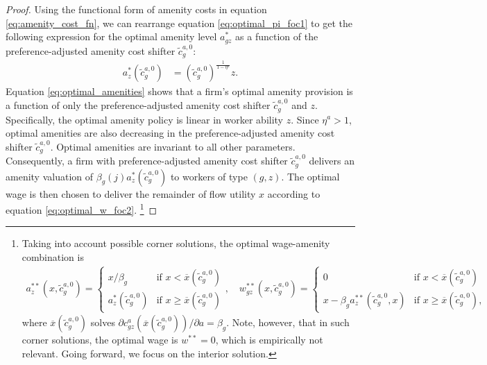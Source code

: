 \begin{proof}
    Using the functional form of amenity costs in equation \eqref{eq:amenity_cost_fn}, we can rearrange equation \eqref{eq:optimal_pi_foc1} to get the following expression for the optimal amenity level $a_{gz}^{*}$ as a function of the preference-adjusted amenity cost shifter $\tilde{c}_{g}^{a,0}$:
    \begin{align}
        a_{z}^{*}\left(\tilde{c}_{g}^{a,0}\right) &= \left(\tilde{c}_{g}^{a,0} \right)^{\frac{1}{1 - \eta^{a}}} z. \label{eq:optimal_amenities}
    \end{align}
    Equation \eqref{eq:optimal_amenities} shows that a firm's optimal amenity provision is a function of only the preference-adjusted amenity cost shifter $\tilde{c}_{g}^{a,0}$ and $z$. Specifically, the optimal amenity policy is linear in worker ability $z$. Since $\eta^{a} > 1$, optimal amenities are also decreasing in the preference-adjusted amenity cost shifter $\tilde{c}_{g}^{a,0}$. Optimal amenities are invariant to all other parameters. Consequently, a firm with preference-adjusted amenity cost shifter $\tilde{c}_{g}^{a,0}$ delivers an amenity valuation of $\beta_{g}(j)a_{z}^{*}(\tilde{c}_{g}^{a,0})$ to workers of type $(g, z)$. The optimal wage is then chosen to deliver the remainder of flow utility $x$ according to equation \eqref{eq:optimal_w_foc2}.%
    \footnote{%
        Taking into account possible corner solutions, the optimal wage-amenity combination is
        \begin{align*}
            a_{z}^{**}\left(x,\tilde{c}_{g}^{a,0}\right) =%
            \begin{cases}
                x / \beta_{g} & \text{if }x<\overline{x}\left(\tilde{c}_{g}^{a,0}\right)\\
                a_{z}^{*}\left(\tilde{c}_{g}^{a,0}\right) & \text{if }x\ge\overline{x}\left(\tilde{c}_{g}^{a,0}\right)
            \end{cases}, \quad%
            w_{gz}^{**}\left(x,\tilde{c}_{g}^{a,0}\right) =%
            \begin{cases}
                0 & \text{if }x<\overline{x}\left(\tilde{c}_{g}^{a,0}\right)\\
                x - \beta_{g} a_{z}^{**}\left(\tilde{c}_{g}^{a,0},x\right) & \text{if }x\ge\overline{x}\left(\tilde{c}_{g}^{a,0}\right),
            \end{cases}
        \end{align*}
        where $\overline{x}\left(\tilde{c}_{g}^{a,0}\right)$ solves $\partial c_{gz}^{a}(\overline{x}\left(\tilde{c}_{g}^{a,0}\right)) / \partial a = \beta_{g}$. Note, however, that in such corner solutions, the optimal wage is $w^{**} = 0$, which is empirically not relevant. Going forward, we focus on the interior solution.%
    } %


\end{proof}
